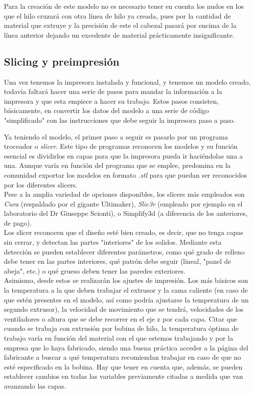 \documentclass[a4paper,12pt]{article}
\begin{document}
Para la creación de este modelo no es necesario tener en cuenta los nudos en los que el hilo cruzará con otra línea de hilo ya creada, pues por la cantidad de material que extruye y la precisión de este el cabezal pasará por encima de la línea anterior dejando un excedente de material prácticamente insignificante.\\

\FloatBarrier
\subsection{Slicing y preimpresión}
Una vez tenemos la impresora instalada y funcional, y tenemos un modelo creado, todavía faltará hacer una serie de pasos para mandar la información a la impresora y que esta empiece a hacer su trabajo. Estos pasos consisten, básicamente, en convertir los datos del modelo a una serie de código "simplificado" con las instrucciones que debe seguir la impresora paso a paso.

Ya teniendo el modelo, el primer paso a seguir es pasarlo por un programa troceador o \emph{slicer}. Este tipo de programas reconocen los modelos y su función esencial es dividirlos en capas para que la impresora pueda ir haciéndolas una a una. Aunque varía en función del programa que se emplee, predomina en la comunidad exportar los modelos en formato \emph{.stl} para que puedan ser reconocidos por los diferentes slicers.\\

Pese a la amplia variedad de opciones disponibles, los slicers más empleados son \emph{Cura} (respaldado por el gigante Ultimaker), \emph{Slic3r} (empleado por ejemplo en el laboratorio del Dr Giuseppe Scionti), o Simplify3d (a diferencia de los anteriores, de pago).\\

Los slicer reconocen que el diseño esté bien creado, es decir, que no tenga capas sin cerrar, y detectan las partes "interiores" de los solidos. Mediante esta detección se pueden establecer diferentes parámetros, como qué grado de relleno debe tener en las partes interiores, qué patrón debe seguir (lineal, "panel de abeja", etc.) o qué grueso deben tener las paredes exteriores.\\

Asimismo, desde estos se realizarán los ajustes de impresión. Los más básicos son la temperatura a la que deben trabajar el extrusor y la cama caliente (en caso de que estén presentes en el modelo, así como podría ajustarse la temperatura de un segundo extrusor), la velocidad de movimiento que se tendrá, velocidades de los ventiladores o altura que se debe recorrer en el eje z por cada capa. Citar que cuando se trabaja con extrusión por bobina de hilo, la temperatura óptima de trabajo varía en función del material con el que estemos trabajando y por la empresa que lo haya fabricado, siendo una buena práctica acceder a la página del fabricante a buscar a qué temperatura recomiendan trabajar en caso de que no esté especificado en la bobina. Hay que tener en cuenta que, además, se pueden establecer cambios en todas las variables previamente citadas a medida que van avanzando las capas.\\
\end{document}
